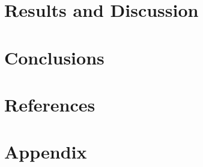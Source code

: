 \documentclass{article}
\begin{document}
\section{Results and Discussion}

\section{Conclusions}

\section{References}

\section{Appendix}
\end{document}
